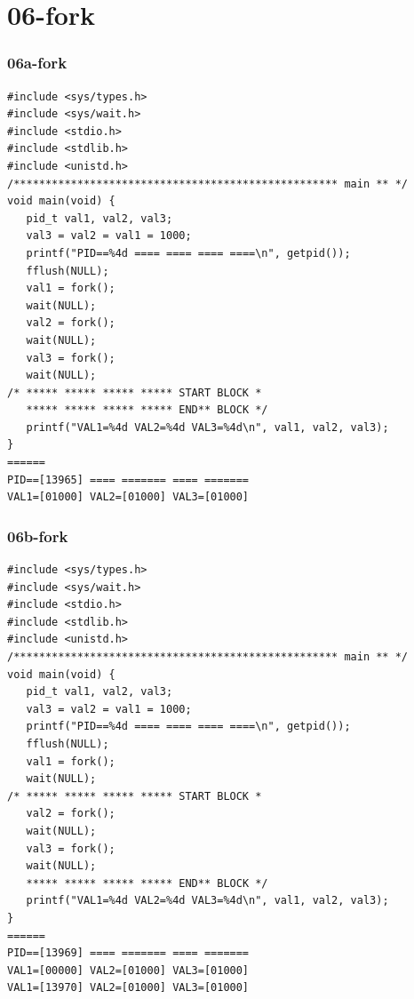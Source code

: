 \documentclass[aspectratio=169, xcolor=table, notheorems, hyperref={pdfpagelabels=false}]{beamer}
\begin{document}
\section{06-fork}
\begin{frame}[fragile]
\frametitle{06a-fork}
\begin{lstlisting}[basicstyle=\ttfamily\tiny]
#include <sys/types.h>
#include <sys/wait.h>
#include <stdio.h>
#include <stdlib.h>
#include <unistd.h>
/*************************************************** main ** */
void main(void) {
   pid_t val1, val2, val3;
   val3 = val2 = val1 = 1000;
   printf("PID==%4d ==== ==== ==== ====\n", getpid());
   fflush(NULL);
   val1 = fork();
   wait(NULL);
   val2 = fork();
   wait(NULL);
   val3 = fork();
   wait(NULL);
/* ***** ***** ***** ***** START BLOCK *
   ***** ***** ***** ***** END** BLOCK */
   printf("VAL1=%4d VAL2=%4d VAL3=%4d\n", val1, val2, val3);
}
======
PID==[13965] ==== ======= ==== =======
VAL1=[01000] VAL2=[01000] VAL3=[01000]
\end{lstlisting}
\end{frame}

\begin{frame}[fragile]
\frametitle{06b-fork}
\begin{lstlisting}[basicstyle=\ttfamily\tiny]
#include <sys/types.h>
#include <sys/wait.h>
#include <stdio.h>
#include <stdlib.h>
#include <unistd.h>
/*************************************************** main ** */
void main(void) {
   pid_t val1, val2, val3;
   val3 = val2 = val1 = 1000;
   printf("PID==%4d ==== ==== ==== ====\n", getpid());
   fflush(NULL);
   val1 = fork();
   wait(NULL);
/* ***** ***** ***** ***** START BLOCK *
   val2 = fork();
   wait(NULL);
   val3 = fork();
   wait(NULL);
   ***** ***** ***** ***** END** BLOCK */
   printf("VAL1=%4d VAL2=%4d VAL3=%4d\n", val1, val2, val3);
}
======
PID==[13969] ==== ======= ==== =======
VAL1=[00000] VAL2=[01000] VAL3=[01000]
VAL1=[13970] VAL2=[01000] VAL3=[01000]

\end{lstlisting}
\end{frame}
\end{document}
